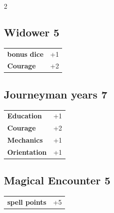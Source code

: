 \begin{multicols}{2}
\begin{tcolorbox}
    \subsection*{Widower \hfill \small{5 }}
    \tcblower




\begin{tabular}{@{}ll@{}}
    \textbf{bonus dice} & +1\\
    \textbf{Courage} & +2\\
\end{tabular}


\end{tcolorbox}

\begin{tcolorbox}
    \subsection*{Journeyman years \hfill \small{7 }}
    \tcblower




\begin{tabular}{@{}ll@{}}
    \textbf{Education} & +1\\
    \textbf{Courage} & +2\\
    \textbf{Mechanics} & +1\\
    \textbf{Orientation} & +1\\
\end{tabular}


\end{tcolorbox}

\begin{tcolorbox}
    \subsection*{Magical Encounter \hfill \small{5 }}
    \tcblower




\begin{tabular}{@{}ll@{}}
    \textbf{spell points} & +5\\
\end{tabular}


\end{tcolorbox}
\end{multicols}
